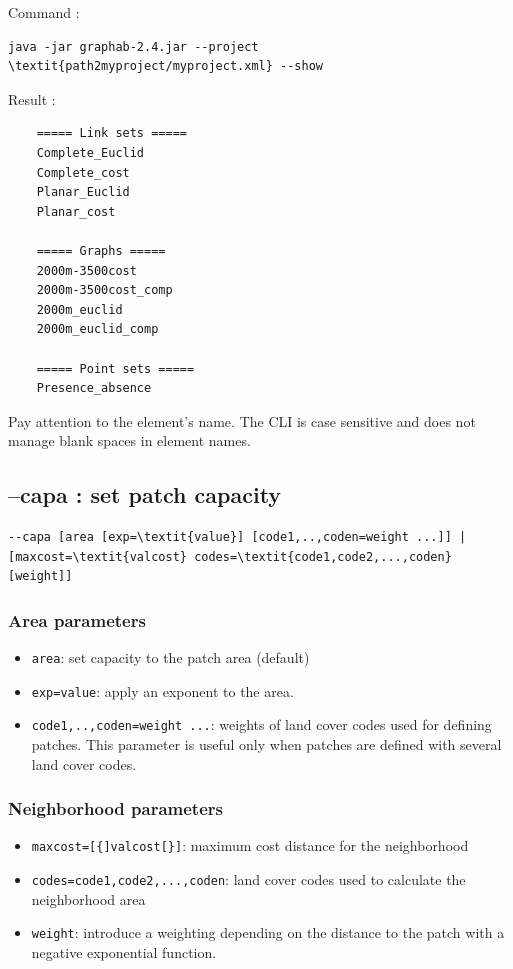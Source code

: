 \documentclass[a4paper,10pt]{report}
\begin{document}
Command :
\begin{Verbatim}[commandchars=\\\{\}]
java -jar graphab-2.4.jar --project \textit{path2myproject/myproject.xml} --show
\end{Verbatim}
Result :
\begin{Verbatim}
	===== Link sets =====
	Complete_Euclid
	Complete_cost
	Planar_Euclid
	Planar_cost
	
	===== Graphs =====
	2000m-3500cost
	2000m-3500cost_comp
	2000m_euclid
	2000m_euclid_comp
	
	===== Point sets =====
	Presence_absence
\end{Verbatim}
Pay attention to the element's name. The CLI is case sensitive and does not manage blank spaces in element names.

\subsection{--capa : set patch capacity}
\begin{Verbatim}[commandchars=\\\{\}]
--capa [area [exp=\textit{value}] [code1,..,coden=weight ...]] | [maxcost=\textit{valcost} codes=\textit{code1,code2,...,coden} [weight]]
\end{Verbatim}

\subsubsection{Area parameters}
\begin{itemize}
	\item \verb|area|: set capacity to the patch area (default)
	\item \verb|exp=value|: apply an exponent to the area.
	\item \verb|code1,..,coden=weight ...|: weights of land cover codes used for defining patches. This parameter is useful only when patches are defined with several land cover codes.
\end{itemize}

\subsubsection{Neighborhood parameters}
\begin{itemize}
	\item \verb|maxcost=[{]valcost[}]|: maximum cost distance for the neighborhood
	\item \verb|codes=code1,code2,...,coden|: land cover codes used to calculate the neighborhood area
	\item \verb|weight|: introduce a weighting depending on the distance to the patch with a negative exponential function.
\end{itemize}
\end{document}
